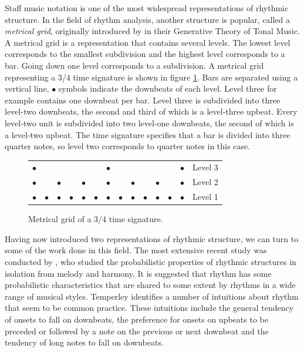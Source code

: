 Staff music notation is one of the most widespread representations of rhythmic structure. In the field of rhythm analysis, another structure is popular, called a \textit{metrical grid}, originally introduced by \citet{lerdahl1983generative} in their Generative Theory of Tonal Music. A metrical grid is a representation that contains several levels. The lowest level corresponds to the smallest subdivision and the highest level corresponds to a bar. Going down one level corresponds to a subdivision. A metrical grid representing a 3/4 time signature is shown in figure \ref{fig:grid}. Bars are separated using a vertical line, $\bullet$ symbols indicate the downbeats of each level. Level three for example contains one downbeat per bar. Level three is subdivided into three level-two downbeats, the second and third of which is a level-three upbeat. Every level-two unit is subdivided into two level-one downbeats, the second of which is a level-two upbeat. The time signature specifies that a bar is divided into three quarter notes, so level two corresponds to quarter notes in this case.

\begin{figure}[b]
\centering
\hspace{2in}
\setlength{\extrarowheight}{-10.5pt}
\begin{tabular}{llllll|llllll|ll}
$\bullet$ &  &  &  &  &  & 		$\bullet$ &  &  &  &  &  & $\bullet$ & Level 3\\ 
$\bullet$ &  & 	$\bullet$ &  & 	$\bullet$ & & 	$\bullet$ & & $\bullet$ &  & $\bullet$ &  & $\bullet$ & Level 2\\
$\bullet$ & 		$\bullet$ & 		$\bullet$ & 		$\bullet$ & $\bullet$ & $\bullet$ & $\bullet$ & $\bullet$ & $\bullet$ & $\bullet$ & $\bullet$ & $\bullet$ & $\bullet$ & Level 1\\
\end{tabular}
\caption{Metrical grid of a 3/4 time signature.}
\label{fig:grid}
\end{figure}

Having now introduced two representations of rhythmic structure, we can turn to some of the work done in this field. The most extensive recent study was conducted by \cite{temperley2010modeling}, who studied the probabilistic properties of rhythmic structures in isolation from melody and harmony. It is suggested that rhythm has some probabilistic characteristics that are shared to some extent by rhythms in a wide range of musical styles. Temperley identifies a number of intuitions about rhythm that seem to be common practice. These intuitions include the general tendency of onsets to fall on downbeats, the preference for onsets on upbeats to be preceded or followed by a note on the previous or next downbeat and the tendency of long notes to fall on downbeats. 

